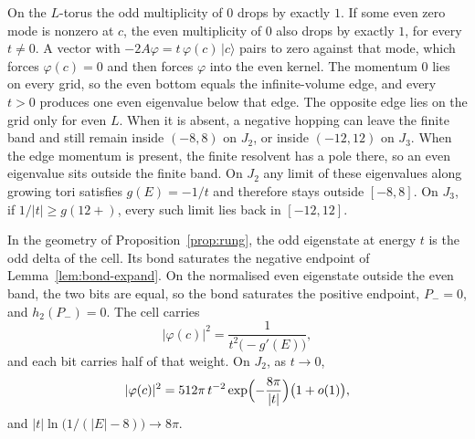 On the \(L\)-torus the odd multiplicity of \(0\) drops by exactly \(1\).
If some even zero mode is nonzero at \(c\), the even multiplicity of \(0\)
also drops by exactly \(1\), for every \(t\neq 0\).
A vector with \(-2A\varphi=t\,\varphi(c)\,|c\rangle\) pairs to zero against
that mode, which forces \(\varphi(c)=0\) and then forces \(\varphi\) into the
even kernel.
The momentum \(0\) lies on every grid, so the even bottom equals the
infinite-volume edge, and every \(t>0\) produces one even eigenvalue below
that edge.
The opposite edge lies on the grid only for even \(L\).
When it is absent, a negative hopping can leave the finite band and still
remain inside \((-8,8)\) on \(J_2\), or inside \((-12,12)\) on \(J_3\).
When the edge momentum is present, the finite resolvent has a pole there,
so an even eigenvalue sits outside the finite band.
On \(J_2\) any limit of these eigenvalues along growing tori satisfies
\(g(E)=-1/t\) and therefore stays outside \([-8,8]\).
On \(J_3\), if \(1/|t|\ge g(12+)\), every such limit lies back in
\([-12,12]\).

\begin{proposition}
\label{prop:rungwt}
In the geometry of Proposition~\ref{prop:rung}, the odd eigenstate at
energy \(t\) is the odd delta of the cell.
Its bond saturates the negative endpoint of
Lemma~\ref{lem:bond-expand}.
On the normalised even eigenstate outside the even band, the two bits
are equal, so the bond saturates the positive endpoint, \(P_-=0\), and
\(h_2(P_-)=0\).
The cell carries
\begin{equation}
\label{eq:rungwt}
|\varphi(c)|^2=\frac{1}{t^2\bigl(-g'(E)\bigr)},
\end{equation}
and each bit carries half of that weight.
On \(J_2\), as \(t\to 0\),
\begin{equation}
\label{eq:rungexp}
|\varphi(c)|^2
=512\pi\, t^{-2}
\exp\Bigl(-\frac{8\pi}{|t|}\Bigr)
\bigl(1+o(1)\bigr),
\end{equation}
and \(|t|\ln\bigl(1/(|E|-8)\bigr)\to 8\pi\).
\end{proposition}

